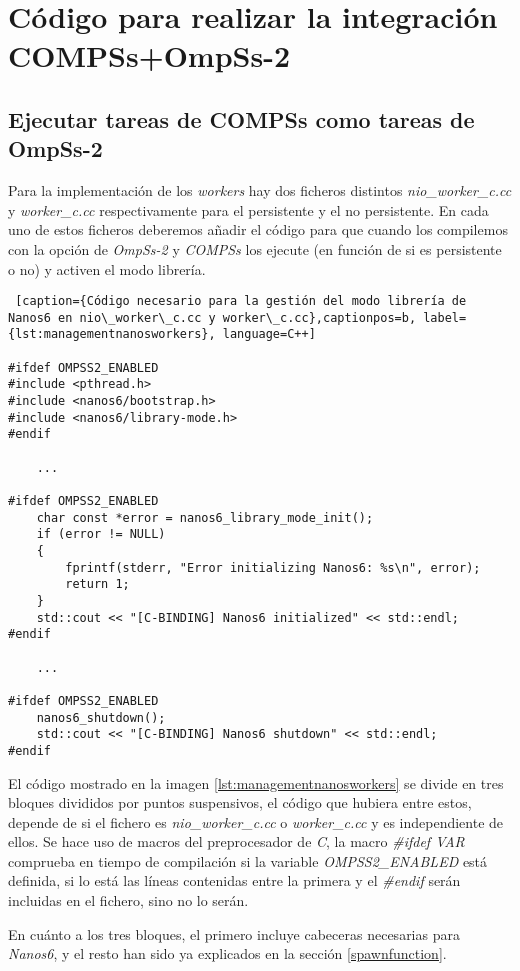 \chapter{Código para realizar la integración COMPSs+OmpSs-2}
\label{appendix:integration}

\section{Ejecutar tareas de COMPSs como tareas de OmpSs-2}

Para la implementación de los \textit{workers} hay dos ficheros distintos \textit{nio\_worker\_c.cc} y \textit{worker\_c.cc} respectivamente para el persistente y el no persistente. En cada uno de estos ficheros deberemos añadir el código para que cuando los compilemos con la opción de \textit{OmpSs-2} y \textit{COMPSs} los ejecute (en función de si es persistente o no) y activen el modo librería.

\bigskip

\begin{minipage}{\linewidth}
\begin{lstlisting} [caption={Código necesario para la gestión del modo librería de Nanos6 en nio\_worker\_c.cc y worker\_c.cc},captionpos=b, label={lst:managementnanosworkers}, language=C++]

#ifdef OMPSS2_ENABLED
#include <pthread.h>
#include <nanos6/bootstrap.h>
#include <nanos6/library-mode.h>
#endif

    ...

#ifdef OMPSS2_ENABLED
    char const *error = nanos6_library_mode_init();
    if (error != NULL)
    {
        fprintf(stderr, "Error initializing Nanos6: %s\n", error);
        return 1;
    }
    std::cout << "[C-BINDING] Nanos6 initialized" << std::endl;
#endif

    ...
    
#ifdef OMPSS2_ENABLED
    nanos6_shutdown();
    std::cout << "[C-BINDING] Nanos6 shutdown" << std::endl;
#endif

\end{lstlisting}
\end{minipage}

\par\bigskip

El código mostrado en la imagen \ref{lst:managementnanosworkers} se divide en tres bloques divididos por puntos suspensivos, el código que hubiera entre estos, depende de si el fichero es \textit{nio\_worker\_c.cc} o \textit{worker\_c.cc} y es independiente de ellos. Se hace uso de macros del preprocesador de \textit{C}, la macro \textit{\#ifdef VAR} comprueba en tiempo de compilación si la variable \textit{OMPSS2\_ENABLED} está definida, si lo está las líneas contenidas entre la primera y el \textit{\#endif} serán incluidas en el fichero, sino no lo serán.
\par\medskip
En cuánto a los tres bloques, el primero incluye cabeceras necesarias para \textit{Nanos6}, y el resto han sido ya explicados en la sección \ref{spawnfunction}.
\par\bigskip

